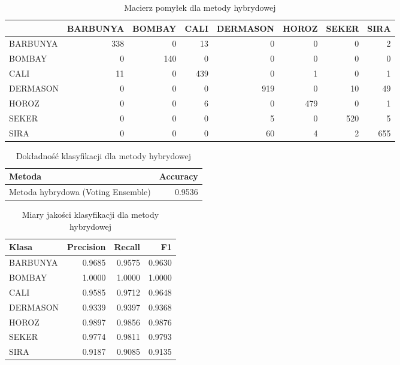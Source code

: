 \begin{table}[H]

\caption{\label{tab:conf-matrix-hybrid}Macierz pomyłek dla metody hybrydowej}
\centering
\begin{tabular}[t]{lrrrrrrr}
\toprule
  & BARBUNYA & BOMBAY & CALI & DERMASON & HOROZ & SEKER & SIRA\\
\midrule
BARBUNYA & 338 & 0 & 13 & 0 & 0 & 0 & 2\\
BOMBAY & 0 & 140 & 0 & 0 & 0 & 0 & 0\\
CALI & 11 & 0 & 439 & 0 & 1 & 0 & 1\\
DERMASON & 0 & 0 & 0 & 919 & 0 & 10 & 49\\
HOROZ & 0 & 0 & 6 & 0 & 479 & 0 & 1\\
\addlinespace
SEKER & 0 & 0 & 0 & 5 & 0 & 520 & 5\\
SIRA & 0 & 0 & 0 & 60 & 4 & 2 & 655\\
\bottomrule
\end{tabular}
\end{table}

\begin{table}[H]

\caption{\label{tab:accuracy-hybrid}Dokładność klasyfikacji dla metody hybrydowej}
\centering
\begin{tabular}[t]{lr}
\toprule
Metoda & Accuracy\\
\midrule
Metoda hybrydowa (Voting Ensemble) & 0.9536\\
\bottomrule
\end{tabular}
\end{table}

\begin{table}[H]

\caption{\label{tab:metrics-hybrid}Miary jakości klasyfikacji dla metody hybrydowej}
\centering
\begin{tabular}[t]{lrrr}
\toprule
Klasa & Precision & Recall & F1\\
\midrule
BARBUNYA & 0.9685 & 0.9575 & 0.9630\\
BOMBAY & 1.0000 & 1.0000 & 1.0000\\
CALI & 0.9585 & 0.9712 & 0.9648\\
DERMASON & 0.9339 & 0.9397 & 0.9368\\
HOROZ & 0.9897 & 0.9856 & 0.9876\\
\addlinespace
SEKER & 0.9774 & 0.9811 & 0.9793\\
SIRA & 0.9187 & 0.9085 & 0.9135\\
\bottomrule
\end{tabular}
\end{table}

